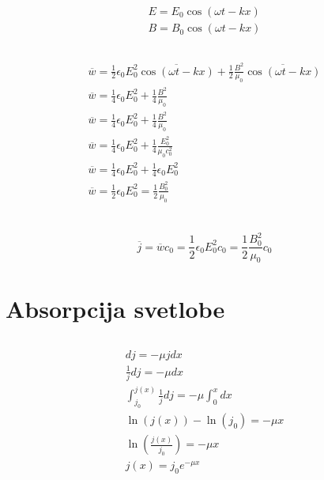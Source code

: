 \documentclass[a4paper,12pt]{article}
\begin{document}
\begin{align}
    E = E_0 \cos(\omega t - kx) \\
    B = B_0 \cos(\omega t - kx)
\end{align}

\subsection{}
\begin{align}
    \overline{w} = \frac{1}{2} \epsilon_0 E_0^2 \overline{\cos(\omega t - kx)} + \frac{1}{2} \frac{B^2}{\mu_0} \overline{\cos(\omega t - kx)} \\
    \overline{w} = \frac{1}{4} \epsilon_0 E_0^2 + \frac{1}{4} \frac{B^2}{\mu_0} \\
    \overline{w} = \frac{1}{4} \epsilon_0 E_0^2 + \frac{1}{4} \frac{B^2}{\mu_0} \\
    \overline{w} = \frac{1}{4} \epsilon_0 E_0^2 + \frac{1}{4} \frac{E_0^2}{\mu_0 c_0^2} \\
    \overline{w} = \frac{1}{4} \epsilon_0 E_0^2 + \frac{1}{4} \epsilon_0 E_0^2 \\
    \overline{w} = \frac{1}{2} \epsilon_0 E_0^2 = \frac{1}{2} \frac{B_0^2}{\mu_0} \\
\end{align}

\subsection{}
\begin{equation}
    \overline{j} = \overline{w} c_0 = \frac{1}{2} \epsilon_0 E_0^2 c_0 = \frac{1}{2} \frac{B_0^2}{\mu_0} c_0
\end{equation}

\newpage
\section{Absorpcija svetlobe}
\subsection{}
\begin{align}
    dj = -\mu j dx \\
    \frac{1}{j} dj = -\mu dx \\
    \int_{j_0}^{j(x)} \frac{1}{j} dj = -\mu \int_{0}^{x} dx \\
    \ln(j(x)) - \ln(j_0) = -\mu x \\
    \ln\left(\frac{j(x)}{j_0}\right) = -\mu x \\
    j(x) = j_0 e^{-\mu x} \\
\end{align}
\end{document}

